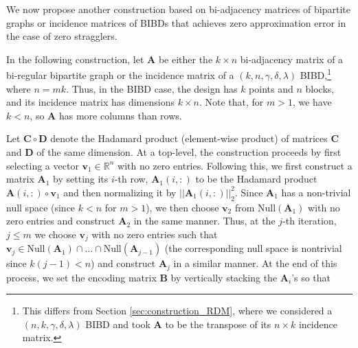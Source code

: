 \documentclass[journal,draftcls,onecolumn]{IEEEtran}
\theoremstyle{mystyle}
\newcommand{\bfC}{\mathbf{C}}
\newcommand{\bfD}{\mathbf{D}}
\newcommand{\bfA}{\mathbf{A}}
\newcommand{\bfB}{\mathbf{B}}
\newcommand{\bfv}{\mathbf{v}}
\begin{document}
We now propose another construction based on bi-adjacency matrices of bipartite graphs or incidence matrices of BIBDs that achieves zero approximation error in the case of zero stragglers. 





In the following construction, let $\mathbf{A}$ be either the $k\times n$ bi-adjacency matrix of a bi-regular bipartite graph or the incidence matrix of a $(k,n,\gamma,\delta,\lambda)$ BIBD,\footnote{This differs from Section \ref{sec:construction_RDM}, where we considered a $(n,k,\gamma,\delta,\lambda)$ BIBD and took $\mathbf{A}$ to be the transpose of its $n\times k$ incidence matrix.} where $n=mk$. Thus, in the BIBD case, the design has $k$ points and $n$ blocks, and its incidence matrix has dimensions $k\times n$. Note that, for $m>1$, we have $k<n$, so $\mathbf{A}$ has more columns than rows.



Let $\bfC \circ \bfD$ denote the Hadamard product (element-wise product) of matrices $\bfC$ and $\bfD$ of the same dimension. At a top-level, the construction proceeds by first selecting a vector $\bfv_1 \in \mathbb{R}^n$ with no zero entries. Following this, we first construct a matrix $\bfA_1$ by setting its $i$-th row, $\bfA_1(i,:)$ to be the Hadamard product $\bfA(i,:) \circ \bfv_1$ and then normalizing it by $||\bfA_1(i,:)||_2^2$. Since $\bfA_1$ has a non-trivial null space (since $k < n$ for $m>1$), we then choose $\bfv_2$ from $\text{Null}(\bfA_1)$ with no zero entries and construct $\bfA_2$ in the same manner. Thus, at the $j$-th iteration, $j \leq m$ we choose $\bfv_j$ with no zero entries such that $ \bfv_j \in \text{Null}(\bfA_1) \cap \dots \cap \text{Null}(\bfA_{j-1})$ (the corresponding null space is nontrivial since $k(j-1) < n$) and construct $\bfA_j$ in a similar manner. At the end of this process, we set the encoding matrix $\bfB$ by vertically stacking the $\bfA_i$'s so that
\end{document}
